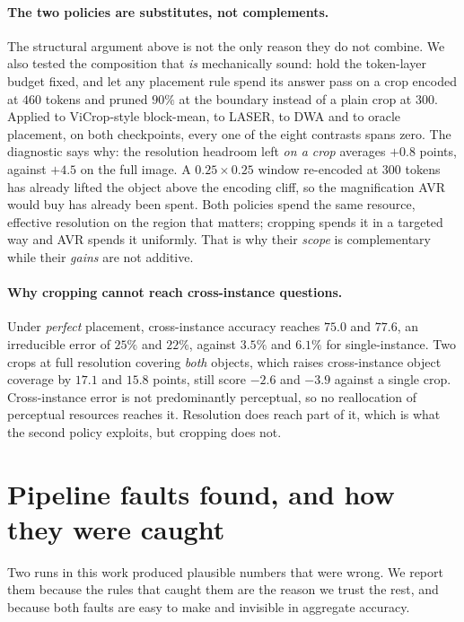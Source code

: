 \paragraph{The two policies are substitutes, not complements.} The structural argument above is not the only
reason they do not combine. We also tested the composition that \emph{is} mechanically sound: hold the token-layer
budget fixed, and let any placement rule spend its answer pass on a crop encoded at $460$ tokens and pruned $90\%$
at the boundary instead of a plain crop at $300$. Applied to ViCrop-style block-mean, to LASER, to DWA and to
oracle placement, on both checkpoints, every one of the eight contrasts spans zero. The diagnostic says why: the
resolution headroom left \emph{on a crop} averages $+0.8$ points, against $+4.5$ on the full image. A
$0.25\times0.25$ window re-encoded at $300$ tokens has already lifted the object above the encoding cliff, so the
magnification AVR would buy has already been spent. Both policies spend the same resource, effective resolution on
the region that matters; cropping spends it in a targeted way and AVR spends it uniformly. That is why their
\emph{scope} is complementary while their \emph{gains} are not additive.

\paragraph{Why cropping cannot reach cross-instance questions.} Under \emph{perfect} placement, cross-instance
accuracy reaches $75.0$ and $77.6$, an irreducible error of $25\%$ and $22\%$, against $3.5\%$ and $6.1\%$ for
single-instance. Two crops at full resolution covering \emph{both} objects, which raises cross-instance object coverage by
$17.1$ and $15.8$ points, still score $-2.6$ and $-3.9$ against a single crop. Cross-instance error is not predominantly perceptual, so no
reallocation of perceptual resources reaches it. Resolution does reach part of it, which is what the second policy
exploits, but cropping does not.

\section{Pipeline faults found, and how they were caught}\label{app:faults}

Two runs in this work produced plausible numbers that were wrong. We report them because the rules that caught them
are the reason we trust the rest, and because both faults are easy to make and invisible in aggregate accuracy.

